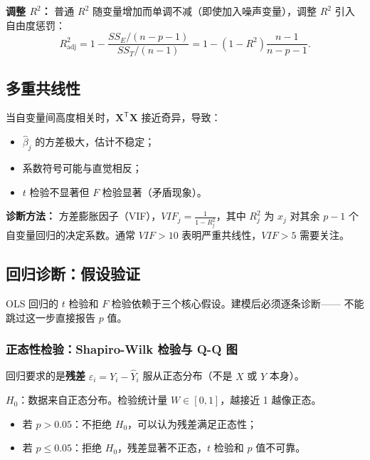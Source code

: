\textbf{调整 $R^2$：} 普通 $R^2$ 随变量增加而单调不减（即使加入噪声变量），调整 $R^2$ 引入自由度惩罚：
\begin{equation}
    R^2_{\text{adj}} = 1 - \frac{SS_E/(n-p-1)}{SS_T/(n-1)}
                     = 1 - (1-R^2) \frac{n-1}{n-p-1}.
\end{equation}

\subsection{多重共线性}

当自变量间高度相关时，$\bm{X}^{\mathsf{T}}\bm{X}$ 接近奇异，导致：
\begin{itemize}
    \item $\hat{\beta}_j$ 的方差极大，估计不稳定；
    \item 系数符号可能与直觉相反；
    \item $t$ 检验不显著但 $F$ 检验显著（矛盾现象）。
\end{itemize}

\textbf{诊断方法：} 方差膨胀因子（VIF），$VIF_j = \frac{1}{1 - R_j^2}$，其中 $R_j^2$ 为 $x_j$ 对其余 $p-1$ 个自变量回归的决定系数。通常 $VIF > 10$ 表明严重共线性，$VIF > 5$ 需要关注。

\subsection{回归诊断：假设验证}

OLS 回归的 $t$ 检验和 $F$ 检验依赖于三个核心假设。建模后必须逐条诊断——
不能跳过这一步直接报告 $p$ 值。

\subsubsection{正态性检验：Shapiro-Wilk 检验与 Q-Q 图}

回归要求的是\textbf{残差} $\varepsilon_i = Y_i - \hat{Y}_i$ 服从正态分布（不是 $X$ 或 $Y$ 本身）。

\begin{definition}
$H_0$：数据来自正态分布。检验统计量 $W \in [0,1]$，越接近 1 越像正态。

\begin{itemize}
    \item 若 $p > 0.05$：不拒绝 $H_0$，可以认为残差满足正态性；
    \item 若 $p \le 0.05$：拒绝 $H_0$，残差显著不正态，$t$ 检验和 $p$ 值不可靠。
\end{itemize}
\end{definition}

